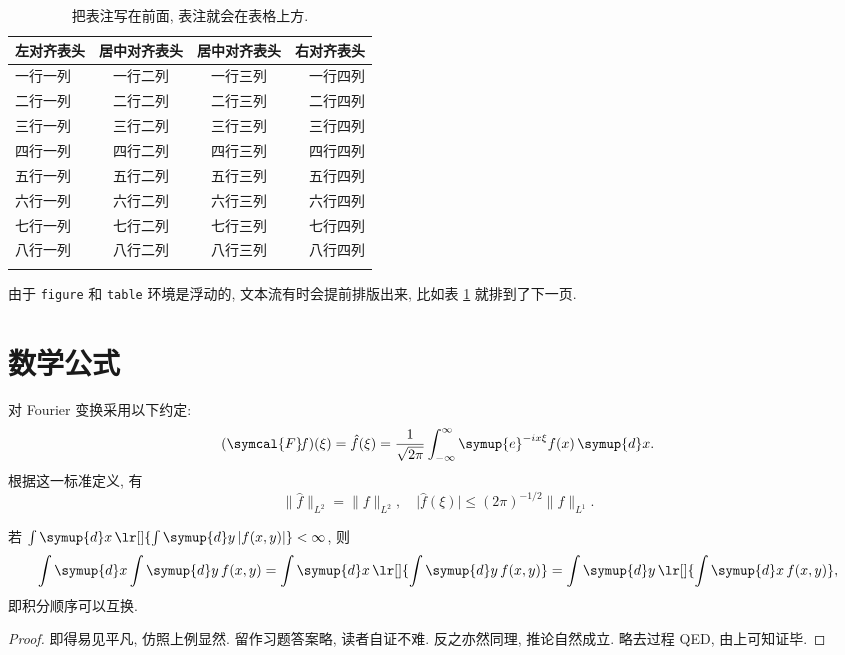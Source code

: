 \documentclass[newenv,newcmd]{ncuthesis}
\begin{document}
\begin{table}[htb]
\centering
\caption{把表注写在前面, 表注就会在表格上方.}
\begin{tabular}{lccr}
  \thickhline
  左对齐表头 & 居中对齐表头 & 居中对齐表头 & 右对齐表头 \\
  \hline
  一行一列   & 一行二列     & 一行三列     & 一行四列 \\
  二行一列   & 二行二列     & 二行三列     & 二行四列 \\
  三行一列   & 三行二列     & 三行三列     & 三行四列 \\
  四行一列   & 四行二列     & 四行三列     & 四行四列 \\
  五行一列   & 五行二列     & 五行三列     & 五行四列 \\
  六行一列   & 六行二列     & 六行三列     & 六行四列 \\
  七行一列   & 七行二列     & 七行三列     & 七行四列 \\
  八行一列   & 八行二列     & 八行三列     & 八行四列 \\
  \thickhline
\end{tabular}
\label{tab:example-tab}
\end{table}

由于 \verb|figure| 和 \verb|table| 环境是浮动的, 文本流有时会提前排版出来, 
比如表 \ref{tab:example-tab} 就排到了下一页. 

\section{数学公式}
对 Fourier 变换采用以下约定:
\begin{equation}
  (\symcal{F}\!f)(\xi) = \hat f(\xi) = \frac{1}{\sqrt{2\pi}}
    \int_{-\infty}^{\infty}\symup{e}^{-ix\xi}f(x)\,\symup{d}x.
\end{equation}
根据这一标准定义, 有
\[
  \lVert\hat f\rVert_{L^2} = \lVert f\rVert_{L^2},\quad
  \lvert\hat f(\xi)\rvert \leq (2\pi)^{-1/2}\lVert f\rVert_{L^1}.
\]
\begin{theorem}[Fubini 定理]
若 $\int\symup{d}x\,\lr[]{\int\symup{d}y\,\lvert f(x,y)\rvert} < \infty$, 则
\begin{equation}
  \int\symup{d}x\int\symup{d}y\,f(x,y)
    = \int\symup{d}x\,\lr[]{\int\symup{d}y\,f(x,y)}
    = \int\symup{d}y\,\lr[]{\int\symup{d}x\,f(x,y)},
\end{equation}
即积分顺序可以互换.
\end{theorem}
\begin{proof}
即得易见平凡, 仿照上例显然. 留作习题答案略, 读者自证不难. 
反之亦然同理, 推论自然成立. 略去过程 QED, 由上可知证毕. \freeze
\end{proof}
\appendix
\end{document}
